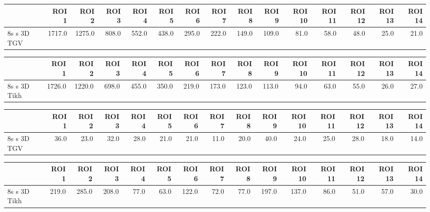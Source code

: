 \begin{tabular}{lrrrrrrrrrrrrrr}
\toprule
{} &   ROI 1 &   ROI 2 &  ROI 3 &  ROI 4 &  ROI 5 &  ROI 6 &  ROI 7 &  ROI 8 &  ROI 9 &  ROI 10 &  ROI 11 &  ROI 12 &  ROI 13 &  ROI 14 \\
\midrule
8s s 3D TGV &  1717.0 &  1275.0 &  808.0 &  552.0 &  438.0 &  295.0 &  222.0 &  149.0 &  109.0 &    81.0 &    58.0 &    48.0 &    25.0 &    21.0 \\
\bottomrule
\end{tabular}
\begin{tabular}{lrrrrrrrrrrrrrr}
\toprule
{} &   ROI 1 &   ROI 2 &  ROI 3 &  ROI 4 &  ROI 5 &  ROI 6 &  ROI 7 &  ROI 8 &  ROI 9 &  ROI 10 &  ROI 11 &  ROI 12 &  ROI 13 &  ROI 14 \\
\midrule
8s s 3D Tikh &  1726.0 &  1220.0 &  698.0 &  455.0 &  350.0 &  219.0 &  173.0 &  123.0 &  113.0 &    94.0 &    63.0 &    55.0 &    26.0 &    27.0 \\
\bottomrule
\end{tabular}
\begin{tabular}{lrrrrrrrrrrrrrr}
\toprule
{} &  ROI 1 &  ROI 2 &  ROI 3 &  ROI 4 &  ROI 5 &  ROI 6 &  ROI 7 &  ROI 8 &  ROI 9 &  ROI 10 &  ROI 11 &  ROI 12 &  ROI 13 &  ROI 14 \\
\midrule
8s s 3D TGV &   36.0 &   23.0 &   32.0 &   28.0 &   21.0 &   21.0 &   11.0 &   20.0 &   40.0 &    24.0 &    25.0 &    28.0 &    18.0 &    14.0 \\
\bottomrule
\end{tabular}
\begin{tabular}{lrrrrrrrrrrrrrr}
\toprule
{} &  ROI 1 &  ROI 2 &  ROI 3 &  ROI 4 &  ROI 5 &  ROI 6 &  ROI 7 &  ROI 8 &  ROI 9 &  ROI 10 &  ROI 11 &  ROI 12 &  ROI 13 &  ROI 14 \\
\midrule
8s s 3D Tikh &  219.0 &  285.0 &  208.0 &   77.0 &   63.0 &  122.0 &   72.0 &   77.0 &  197.0 &   137.0 &    86.0 &    51.0 &    57.0 &    30.0 \\
\bottomrule
\end{tabular}
